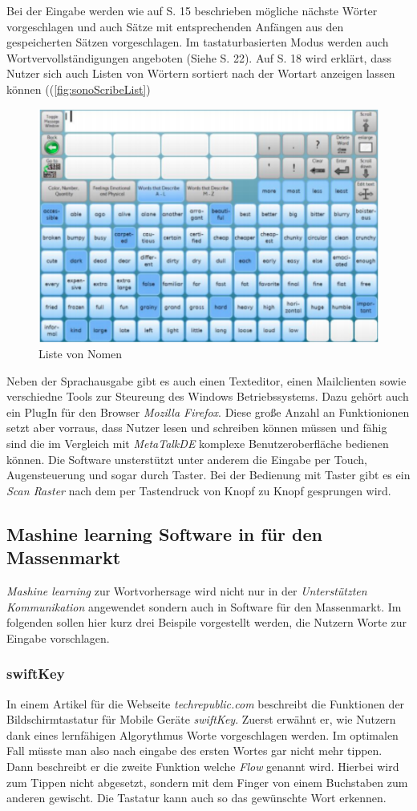             Bei der Eingabe werden wie auf S. 15 beschrieben mögliche nächste Wörter vorgeschlagen und auch Sätze mit entsprechenden Anfängen aus den gespeicherten Sätzen vorgeschlagen. Im tastaturbasierten Modus werden auch Wortvervollständigungen angeboten (Siehe S. 22). Auf S. 18 wird erklärt, dass Nutzer sich auch Listen von Wörtern sortiert nach der Wortart anzeigen lassen können ((\autoref{fig:sonoScribeList})
            
            \begin{figure}[H]
  				\centering
  				\includegraphics[width=.5\linewidth]{images/SonoScribeList.png}
  				\caption{Liste von Nomen \parencite[S. 18]{tobii:sonoScribeManual}}
                \label{fig:sonoScribeList}
			\end{figure}
            
			Neben der Sprachausgabe gibt es auch einen Texteditor, einen Mailclienten sowie verschiedne Tools zur Steureung des Windows Betriebssystems. Dazu gehört auch ein PlugIn für den Browser \emph{Mozilla Firefox}. Diese große Anzahl an Funktionionen setzt aber vorraus, dass Nutzer lesen und schreiben können müssen und fähig sind die im Vergleich mit \emph{MetaTalkDE} komplexe Benutzeroberfläche bedienen können. Die Software unsterstützt unter anderem die Eingabe per Touch, Augensteuerung und sogar durch Taster. Bei der Bedienung mit Taster gibt es ein \emph{Scan Raster} nach dem per Tastendruck von Knopf zu Knopf gesprungen wird.
    
	\subsection{Mashine learning Software in für den Massenmarkt}
    \emph{Mashine learning} zur Wortvorhersage wird nicht nur in der \emph{Unterstützten Kommunikation} angewendet sondern auch in Software für den Massenmarkt. Im folgenden sollen hier kurz drei Beispile vorgestellt werden, die Nutzern Worte zur Eingabe vorschlagen.
        
        \subsubsection*{swiftKey}
        	In einem Artikel für die Webseite \emph{techrepublic.com} beschreibt \cite{techrepublic:swiftKey} die Funktionen der Bildschirmtastatur für Mobile Geräte \emph{swiftKey}. Zuerst erwähnt er, wie Nutzern dank eines lernfähigen Algorythmus Worte vorgeschlagen werden. Im optimalen Fall müsste man also nach eingabe des ersten Wortes gar nicht mehr tippen. Dann beschreibt er die zweite Funktion welche \emph{Flow} genannt wird. Hierbei wird zum Tippen nicht abgesetzt, sondern mit dem Finger von einem Buchstaben zum anderen gewischt. Die Tastatur kann auch so das gewünschte Wort erkennen.
        
